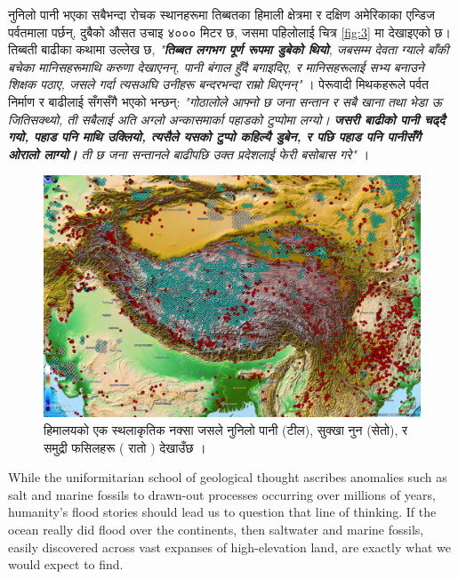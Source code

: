\documentclass[10pt,twocolumn,letterpaper]{article}
\begin{document}
नुनिलो पानी भएका सबैभन्दा रोचक स्थानहरूमा तिब्बतका हिमाली क्षेत्रमा र दक्षिण अमेरिकाका एन्डिज पर्वतमाला पर्छन्, दुबैको औसत उचाइ ४००० मिटर छ, जसमा पहिलोलाई चित्र \ref{fig:3} मा देखाइएको छ। तिब्बती बाढीका कथामा उल्लेख छ, \textit{"\textbf{तिब्बत लगभग पूर्ण रूपमा डुबेको थियो}, जबसम्म देवता ग्याले बाँकी बचेका मानिसहरूमाथि करुणा देखाएनन्, पानी बंगाल हुँदै बगाइदिए, र मानिसहरूलाई सभ्य बनाउने शिक्षक पठाए, जसले गर्दा त्यसअघि उनीहरू बन्दरभन्दा राम्रो थिएनन्"} \cite{3}। पेरूवादी मिथकहरूले पर्वत निर्माण र बाढीलाई सँगसँगै भएको भन्छन्: \textit{"गोठालोले आफ्नो छ जना सन्तान र सबै खाना तथा भेडा ऊ जितिसक्थ्यो, ती सबैलाई अति अग्लो अन्कासमार्का पहाडको टुप्पोमा लग्यो। \textbf{जसरी बाढीको पानी चढ्दै गयो, पहाड पनि माथि उक्लियो, त्यसैले यसको टुप्पो कहिल्यै डुबेन, र पछि पहाड पनि पानीसँगै ओरालो लाग्यो।} ती छ जना सन्तानले बाढीपछि उक्त प्रदेशलाई फेरी बसोबास गरे"} \cite{3}।
\begin{figure}[t]
\begin{center}
   \includegraphics[width=1\linewidth]{tibet.jpg}
\end{center}
   \caption{हिमालयको एक स्थलाकृतिक नक्सा जसले नुनिलो पानी (टील), सुक्खा नुन (सेतो), र समुद्री फसिलहरू ( रातो ) देखाउँछ \cite{15,16,86,87}।}
\label{fig:3}
\label{fig:onecol}
\end{figure}
While the uniformitarian school of geological thought ascribes anomalies such as salt and marine fossils to drawn-out processes occurring over millions of years, humanity's flood stories should lead us to question that line of thinking. If the ocean really did flood over the continents, then saltwater and marine fossils, easily discovered across vast expanses of high-elevation land, are exactly what we would expect to find.
\end{document}
